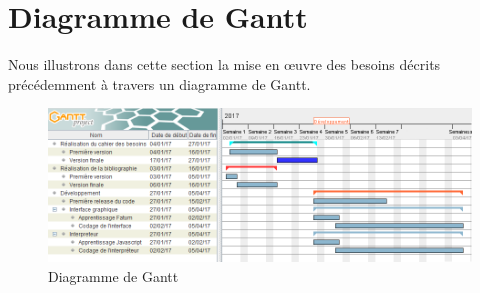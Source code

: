 \documentclass[12pt,a4paper]{article}
\begin{document}
\section{Diagramme de Gantt}
Nous illustrons dans cette section la mise en œuvre des besoins décrits précédemment à travers un diagramme de Gantt. 
\begin{figure}[H]
  \centering
    \includegraphics[width=1\textwidth]{images/GanttDiagram_edited.png}
    \caption{Diagramme de Gantt}
\end{figure}
\newpage

\end{document}
